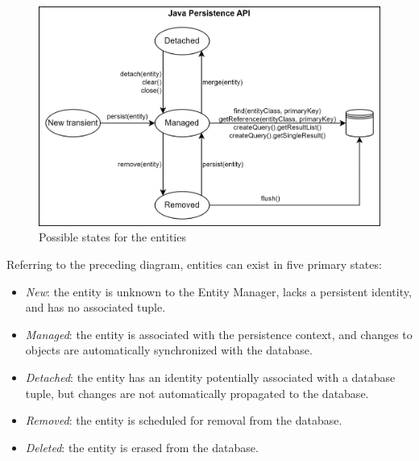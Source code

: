 \begin{figure}[H]
    \centering
    \includegraphics[width=0.75\linewidth]{images/jpaem.png}
    \caption{Possible states for the entities}
\end{figure}
Referring to the preceding diagram, entities can exist in five primary states:
\begin{itemize}
    \item \textit{New}: the entity is unknown to the Entity Manager, lacks a persistent identity, and has no associated tuple.
    \item \textit{Managed}: the entity is associated with the persistence context, and changes to objects are automatically synchronized with the database.
    \item \textit{Detached}: the entity has an identity potentially associated with a database tuple, but changes are not automatically propagated to the database.
    \item \textit{Removed}: the entity is scheduled for removal from the database.
    \item \textit{Deleted}: the entity is erased from the database.
\end{itemize}

